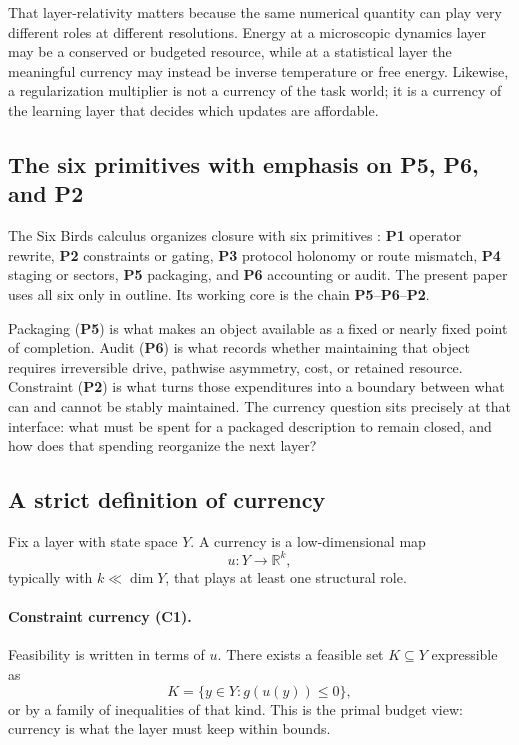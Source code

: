 \documentclass[11pt,a4paper]{article}
\newcommand{\R}{\mathbb{R}}
\begin{document}
That layer-relativity matters because the same numerical quantity can play very different roles at different resolutions. Energy at a microscopic dynamics layer may be a conserved or budgeted resource, while at a statistical layer the meaningful currency may instead be inverse temperature or free energy. Likewise, a regularization multiplier is not a currency of the task world; it is a currency of the learning layer that decides which updates are affordable.

\subsection{The six primitives with emphasis on P5, P6, and P2}

The Six Birds calculus organizes closure with six primitives \cite{tsiokos2026sixbirds}: \textbf{P1} operator rewrite, \textbf{P2} constraints or gating, \textbf{P3} protocol holonomy or route mismatch, \textbf{P4} staging or sectors, \textbf{P5} packaging, and \textbf{P6} accounting or audit. The present paper uses all six only in outline. Its working core is the chain \textbf{P5}--\textbf{P6}--\textbf{P2}.

Packaging (\textbf{P5}) is what makes an object available as a fixed or nearly fixed point of completion. Audit (\textbf{P6}) is what records whether maintaining that object requires irreversible drive, pathwise asymmetry, cost, or retained resource. Constraint (\textbf{P2}) is what turns those expenditures into a boundary between what can and cannot be stably maintained. The currency question sits precisely at that interface: what must be spent for a packaged description to remain closed, and how does that spending reorganize the next layer?

\subsection{A strict definition of currency}

Fix a layer with state space \(Y\). A currency is a low-dimensional map
\[
u:Y\to \R^k,
\]
typically with \(k\ll \dim Y\), that plays at least one structural role.

\paragraph{Constraint currency (C1).}
Feasibility is written in terms of \(u\). There exists a feasible set \(K\subseteq Y\) expressible as
\[
K=\{y\in Y: g(u(y))\le 0\},
\]
or by a family of inequalities of that kind. This is the primal budget view: currency is what the layer must keep within bounds.
\end{document}
